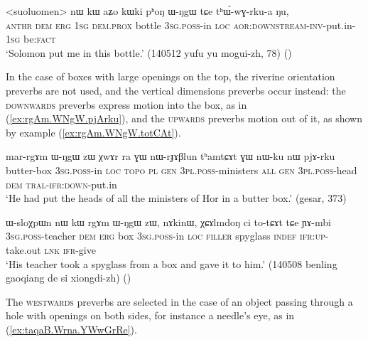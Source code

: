 \begin{exe}
\ex \label{ex:phoN.WNgW.thWwGrkua}
\gll  <suoluomen> nɯ kɯ aʑo kɯki pʰoŋ ɯ-ŋgɯ tɕe tʰɯ́-wɣ-rku-a ŋu,\\
\textsc{anthr} \textsc{dem} \textsc{erg} \textsc{1sg} \textsc{dem}.\textsc{prox} bottle \textsc{3sg}.\textsc{poss}-in \textsc{loc} \textsc{aor}:\textsc{downstream}-\textsc{inv}-put.in-\textsc{1sg} be:\textsc{fact} \\
\glt `Solomon put me in this bottle.' (140512 yufu yu mogui-zh, 78)
()
\end{exe}

In the case of boxes with large openings on the top, the riverine orientation preverbs are not used, and the vertical dimensions preverbs occur instead: the \textsc{downwards} preverbs express motion into the box, as in (\ref{ex:rgAm.WNgW.pjArku}), and the \textsc{upwards} preverbs motion out of it, as shown by example (\ref{ex:rgAm.WNgW.totCAt}).

\begin{exe}
\ex \label{ex:rgAm.WNgW.pjArku}
\gll mar-rgɤm ɯ-ŋgɯ zɯ χwɤr ra ɣɯ nɯ-rɟɤβlun tʰamtɕɤt ɣɯ nɯ-ku nɯ pjɤ-rku \\
butter-box \textsc{3sg}.\textsc{poss}-in \textsc{loc}  \textsc{topo} \textsc{pl} \textsc{gen} \textsc{3pl}.\textsc{poss}-ministers \textsc{all} \textsc{gen} \textsc{3pl}.\textsc{poss}-head \textsc{dem} \textsc{tral}-\textsc{ifr}:\textsc{down}-put.in \\
\glt `He had put the heads of all the ministers of Hor in a butter box.' (gesar, 373)
\end{exe}

\begin{exe}
\ex \label{ex:rgAm.WNgW.totCAt}
\gll ɯ-sloχpɯn nɯ kɯ rgɤm ɯ-ŋgɯ zɯ, nɤkinɯ, χɕɤlmdoŋ ci to-tɕɤt tɕe ɲɤ-mbi \\
\textsc{3sg}.\textsc{poss}-teacher \textsc{dem} \textsc{erg} box \textsc{3sg}.\textsc{poss}-in \textsc{loc} \textsc{filler} spyglass \textsc{indef} \textsc{ifr}:\textsc{up}-take.out \textsc{lnk} \textsc{ifr}-give \\
\glt `His teacher took a spyglass from a box and gave it to him.' (140508 benling gaoqiang de si xiongdi-zh)
()
\end{exe}

The \textsc{westwards} preverbs are selected in the case of an object passing through a hole with openings on both sides, for instance a needle's eye, as in (\ref{ex:taqaB.Wrna.YWwGrRe}).

